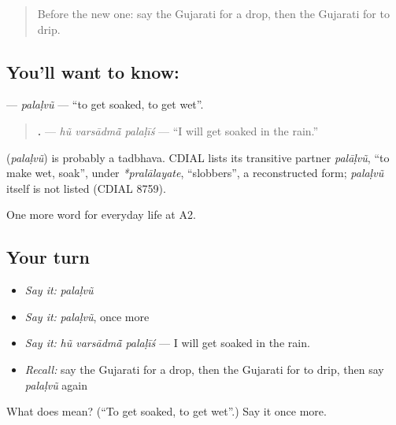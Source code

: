 \label{lesson:GU-C214-palalvu}



\begin{quote}
Before the new one: say the Gujarati for a drop, then the Gujarati for to drip.
\end{quote}

\subsection*{You'll want to know: }
\textbf{} — \emph{palaḷvũ} — \textquotedblleft{}to get soaked, to get wet\textquotedblright{}.

\begin{quote}
\textbf{  .} — \emph{hũ varsādmā̃ palaḷīś} — \textquotedblleft{}I will get soaked in the rain.\textquotedblright{}
\end{quote}

\begin{cousinweb}
\textbf{} (\emph{palaḷvũ}) is probably a tadbhava. CDIAL lists its transitive partner \emph{palāḷvũ}, \textquotedblleft{}to make wet, soak\textquotedblright{}, under \emph{*pralālayate}, \textquotedblleft{}slobbers\textquotedblright{}, a reconstructed form; \emph{palaḷvũ} itself is not listed (CDIAL 8759).
\end{cousinweb}

\begin{grammarlens}[title={What you've built}]
One more word for everyday life at A2.
\end{grammarlens}

\subsection*{Your turn}
\begin{itemize}
\raggedright
  \item \emph{Say it:} \emph{palaḷvũ}
  \item \emph{Say it:} \emph{palaḷvũ}, once more
  \item \emph{Say it:} \emph{hũ varsādmā̃ palaḷīś} — I will get soaked in the rain.
  \item \emph{Recall:} say the Gujarati for a drop, then the Gujarati for to drip, then say \emph{palaḷvũ} again
\end{itemize}

\begin{tcolorbox}[breakable,colback=teal!4,colframe=teal!35!black,title={Before you move on}]
What does  mean? (\textquotedblleft{}To get soaked, to get wet\textquotedblright{}.) Say it once more.
\end{tcolorbox}
